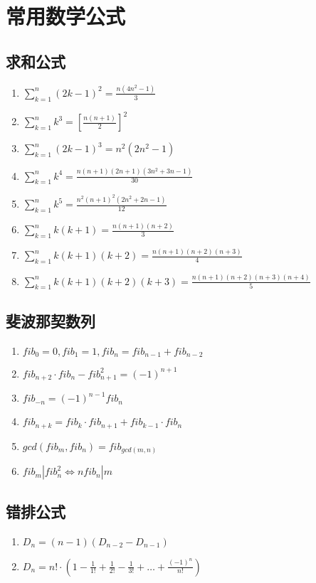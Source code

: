 \section{常用数学公式}
	\subsection{求和公式}
		\begin{enumerate}\setlength{\itemsep}{-\itemsep}
			\item $\sum_{k=1}^{n}(2k-1)^2 = \frac{n(4n^2-1)}{3}	$
			\item $\sum_{k=1}^{n}k^3 = [\frac{n(n+1)}{2}]^2	$
			\item $\sum_{k=1}^{n}(2k-1)^3 = n^2(2n^2-1)	$
			\item $\sum_{k=1}^{n}k^4 = \frac{n(n+1)(2n+1)(3n^2+3n-1)}{30}  $
			\item $\sum_{k=1}^{n}k^5 = \frac{n^2(n+1)^2(2n^2+2n-1)}{12}	$
			\item $\sum_{k=1}^{n}k(k+1) = \frac{n(n+1)(n+2)}{3}	$
			\item $\sum_{k=1}^{n}k(k+1)(k+2) = \frac{n(n+1)(n+2)(n+3)}{4} $
			\item $\sum_{k=1}^{n}k(k+1)(k+2)(k+3) = \frac{n(n+1)(n+2)(n+3)(n+4)}{5} $
		\end{enumerate}
	\subsection{斐波那契数列}
		\begin{enumerate}\setlength{\itemsep}{-\itemsep}
			\item $fib_0=0, fib_1=1, fib_n=fib_{n-1}+fib_{n-2}$
			\item $fib_{n+2} \cdot fib_n-fib_{n+1}^2=(-1)^{n+1}$
			\item $fib_{-n}=(-1)^{n-1}fib_n$
			\item $fib_{n+k}=fib_k \cdot fib_{n+1}+fib_{k-1} \cdot fib_n$
			\item $gcd(fib_m, fib_n)=fib_{gcd(m, n)}$
			\item $fib_m|fib_n^2\Leftrightarrow nfib_n|m$
		\end{enumerate}
	\subsection{错排公式}
		\begin{enumerate}\setlength{\itemsep}{-\itemsep}
			\item $D_n = (n-1)(D_{n-2}-D_{n-1})$
			\item $D_n = n! \cdot (1-\frac{1}{1!}+\frac{1}{2!}-\frac{1}{3!}+\ldots+\frac{(-1)^n}{n!})$
		\end{enumerate}
